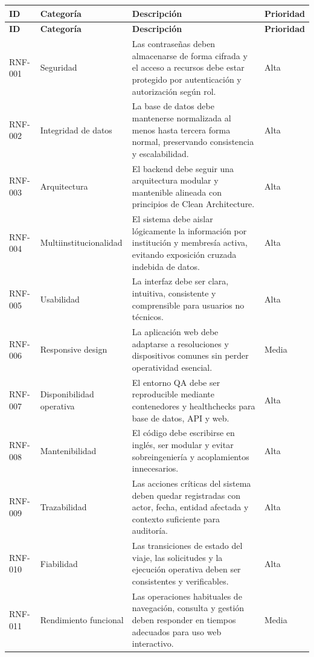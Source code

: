 \documentclass[12pt]{article}
\begin{document}
\begin{longtable}{|P{1.9cm}|P{3.9cm}|P{7.1cm}|P{2.1cm}|}
\hline
{}
\textbf{ID} & \textbf{Categor\'ia} & \textbf{Descripci\'on} & \textbf{Prioridad} \\
\hline
\endfirsthead
\hline
{}
\textbf{ID} & \textbf{Categor\'ia} & \textbf{Descripci\'on} & \textbf{Prioridad} \\
\hline
\endhead
RNF-001 & Seguridad & Las contrase\~nas deben almacenarse de forma cifrada y el acceso a recursos debe estar protegido por autenticaci\'on y autorizaci\'on seg\'un rol. & Alta \\
\hline
RNF-002 & Integridad de datos & La base de datos debe mantenerse normalizada al menos hasta tercera forma normal, preservando consistencia y escalabilidad. & Alta \\
\hline
RNF-003 & Arquitectura & El backend debe seguir una arquitectura modular y mantenible alineada con principios de Clean Architecture. & Alta \\
\hline
RNF-004 & Multiinstitucionalidad & El sistema debe aislar l\'ogicamente la informaci\'on por instituci\'on y membres\'ia activa, evitando exposici\'on cruzada indebida de datos. & Alta \\
\hline
RNF-005 & Usabilidad & La interfaz debe ser clara, intuitiva, consistente y comprensible para usuarios no t\'ecnicos. & Alta \\
\hline
RNF-006 & Responsive design & La aplicaci\'on web debe adaptarse a resoluciones y dispositivos comunes sin perder operatividad esencial. & Media \\
\hline
RNF-007 & Disponibilidad operativa & El entorno QA debe ser reproducible mediante contenedores y healthchecks para base de datos, API y web. & Alta \\
\hline
RNF-008 & Mantenibilidad & El c\'odigo debe escribirse en ingl\'es, ser modular y evitar sobreingenier\'ia y acoplamientos innecesarios. & Alta \\
\hline
RNF-009 & Trazabilidad & Las acciones cr\'iticas del sistema deben quedar registradas con actor, fecha, entidad afectada y contexto suficiente para auditor\'ia. & Alta \\
\hline
RNF-010 & Fiabilidad & Las transiciones de estado del viaje, las solicitudes y la ejecuci\'on operativa deben ser consistentes y verificables. & Alta \\
\hline
RNF-011 & Rendimiento funcional & Las operaciones habituales de navegaci\'on, consulta y gesti\'on deben responder en tiempos adecuados para uso web interactivo. & Media \\

\end{longtable}
\end{document}
